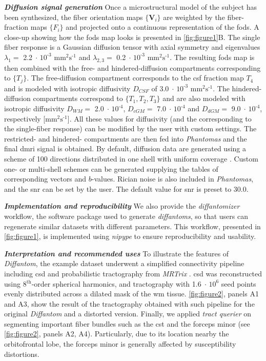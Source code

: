 \documentclass[english]{frontiers/frontiersSCNS} %
\newcommand{\e}[1]{\ensuremath{\;\cdot\,\text{10}^\text{#1}}}
\newcommand{\diffunits}{\ensuremath{\text{mm}^2\text{s}^{\text{-1}}}}
\begin{document}
\noindent\textbf{\textit{Diffusion signal generation\textcolon}\label{sec:data_dwi}} %
Once a microstructural model of the subject has been synthesized, the fiber orientation maps $\{\mathbf{V}_i\}$
  are weighted by the fiber-fraction maps $\{F_i\}$ and projected onto a continuous representation of
  the \glspl{fod}.
A close-up showing how the \glspl{fod} map looks is presented in \autoref{fig:figure1}B.
The single fiber response is a Gaussian diffusion tensor with axial symmetry and eigenvalues $\lambda_1=$ 2.2\e{-3}
  \diffunits{} and $\lambda_{2,3}=$ 0.2\e{-3} \diffunits{}.
The resulting \glspl{fod} map is then combined with the free- and hindered-diffusion compartments corresponding to $\{T_j\}$.
The free-diffusion compartment corresponds to the \gls*{csf} fraction map $T_4$ and is modeled with isotropic
  diffusivity $D_{CSF}$ of 3.0\e{-3} \diffunits{}.
The hindered-diffusion compartments correspond to $\{T_1,T_2,T_3\}$ and are also modeled with isotropic diffusivity
  $D_{WM} =$ 2.0\e{-4}, $D_{cGM} =$ 7.0\e{-4} and $D_{dGM} =$ 9.0\e{-4}, respectively [\diffunits{}].
All these values for diffusivity (and the corresponding to the single-fiber response) can be modified by the user with
  custom settings.
The restricted- and hindered- compartments are then fed into \emph{Phantomas} \citep{caruyer_phantomas_2014}
  and the final \gls*{dmri} signal is obtained.
By default, diffusion data are generated using a scheme of 100 directions distributed in one shell with uniform
  coverage \citep{caruyer_design_2013}.
Custom one- or multi-shell schemes can be generated supplying the tables of corresponding vectors and $b$-values.
Rician noise is also included in \emph{Phantomas}, and the \gls*{snr} can be set by the user.
The default value for \gls*{snr} is preset to 30.0.


\noindent\textbf{\textit{Implementation and reproducibility\textcolon}\label{sec:data_workflow}} %
We also provide the \emph{diffantomizer} workflow, the software package used to generate \emph{diffantoms}, so
  that users can regenerate similar datasets with different parameters.
This workflow, presented in \autoref{fig:figure1}, is implemented using
  \emph{nipype} \citep{gorgolewski_nipype_2011} to ensure reproducibility and usability.

\noindent\textbf{\textit{Interpretation and recommended uses\textcolon}\label{sec:data_use}} %
To illustrate the features of \emph{Diffantom}, the example dataset underwent a simplified
  connectivity pipeline including \gls*{csd} and probabilistic tractography from
  \emph{MRTrix} \citep{tournier_mrtrix_2012}.
\Gls*{csd} was reconstructed using 8$^\text{th}$-order spherical harmonics, and tractography with 1.6\e{6}
  seed points evenly distributed across a dilated mask of the \gls*{wm} tissue.
\autoref{fig:figure2}, panels A1 and A3, show the result of the tractography obtained with such pipeline for
  the original \emph{Diffantom} and a distorted version.
Finally, we applied \emph{tract querier} \citep{wassermann_on_2013} on segmenting important fiber bundles such
  as the \gls*{cst} and the forceps minor (see \autoref{fig:figure2}, panels A2, A4).
Particularly, due to its location nearby the orbitofrontal lobe, the forceps minor is generally affected by
  susceptibility distortions.
\end{document}
